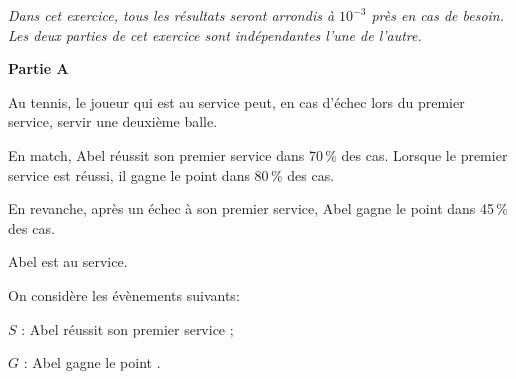 
\medskip

\emph{Dans cet exercice, tous les résultats seront arrondis à $10^{-3}$ près en cas de besoin.\\
Les deux parties de cet exercice sont indépendantes l'une de l'autre.}

\bigskip

\textbf{Partie A}

\medskip

Au tennis, le joueur qui est au service peut, en cas d'échec lors du premier service, servir une deuxième balle.

En match, Abel réussit son premier service dans 70\,\% des cas. Lorsque le premier service est réussi, il gagne le point dans 80\,\% des cas.

En revanche, après un échec à son premier service, Abel gagne
le point dans 45\,\% des cas.


Abel est au service.

\begin{list}{\textbullet}{On considère les évènements suivants:}
\item $S$ : \og Abel réussit son premier service \fg{};
\item $G$ : \og Abel gagne le point \fg.
\end{list}


